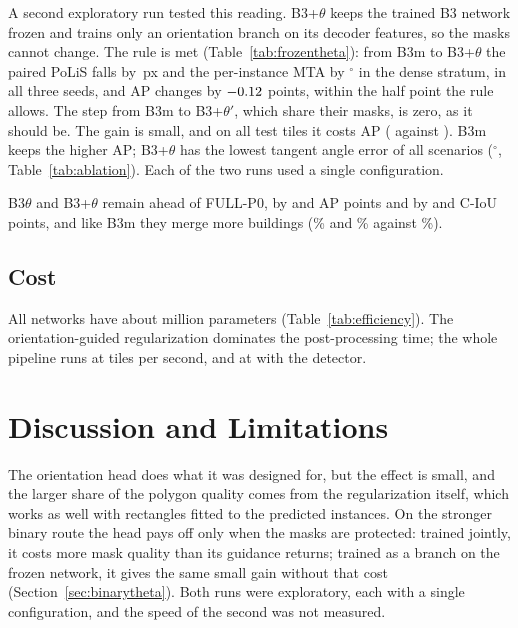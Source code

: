 \documentclass[conference]{IEEEtran}
\newcommand{\fittable}[1]{\resizebox{\ifdim\width>\textwidth\textwidth\else\width\fi}{!}{#1}}
\begin{document}
\begin{table}[t]
\centering
\caption{Orientation branch on the frozen binary network: paired differences in the dense stratum of the test split
(\NTilesDense{} tiles, three seeds), with 95\% bootstrap intervals. B3+$\theta'$ has the masks of B3m; its row checks
that they did not move.}
\label{tab:frozentheta}
\footnotesize\fittable{}
\end{table}
A second exploratory run tested this reading. B3+$\theta$ keeps the trained B3 network frozen and trains only an
orientation branch on its decoder features, so the masks cannot change. The rule is met (Table~\ref{tab:frozentheta}):
from B3m to B3+$\theta$ the paired PoLiS falls by \NFrozThetaTotalPolisAbs\,px and the per-instance MTA by
\NFrozThetaTotalMtaAbs$^\circ$ in the dense stratum, in all three seeds, and AP changes by $-0.12$ points,
within the half point the rule allows. The step from B3m to B3+$\theta'$, which share their masks, is zero, as it
should be. The gain is small, and on all test tiles it costs \NThetaFrozenApAbs{} AP (\NApBthreeh{} against
\NApBthreem). B3m keeps the higher AP; B3+$\theta$ has the lowest tangent angle error of all scenarios
(\NMtaBthreeh$^\circ$, Table~\ref{tab:ablation}). Each of the two runs used a single configuration.

B3$\theta$ and B3+$\theta$ remain ahead of FULL-P0, by \NFullToThetaBinaryApAbs{} and \NFullToThetaFrozenApAbs{} AP points
and by \NFullToThetaBinaryCiouAbs{} and \NFullToThetaFrozenCiouAbs{} C-IoU points, and like B3m they merge more buildings
(\NMergeBthreet\% and \NMergeBthreeh\% against \NMergeFull\%).

\subsection{Cost}
\begin{table}[t]
\centering
\caption{Cost on an RTX 5090 and one CPU thread for the post-processing. The detector's parameters are not included.}
\label{tab:efficiency}
\resizebox{\columnwidth}{!}{}
\end{table}
All networks have about \NParamsFull{} million parameters (Table~\ref{tab:efficiency}). The orientation-guided
regularization dominates the post-processing time; the whole pipeline runs at \NFpsFull{} tiles per second, and at
\NFpsFullY{} with the detector.

\section{Discussion and Limitations}
The orientation head does what it was designed for, but the effect is small, and the larger share of the polygon
quality comes from the regularization itself, which works as well with rectangles fitted to the predicted instances.
On the stronger binary route the head pays off only when the masks are protected: trained jointly, it costs more mask
quality than its guidance returns; trained as a branch on the frozen network, it gives the same small gain without
that cost (Section~\ref{sec:binarytheta}). Both runs were exploratory, each with a single configuration, and the speed
of the second was not measured.
\end{document}
